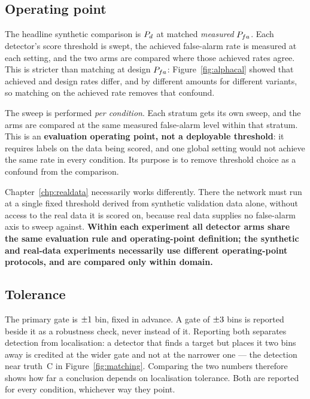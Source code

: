 \subsection{Operating point}
\label{sec:opoint}

The headline synthetic comparison is $P_{d}$ at matched \emph{measured} $P_{fa}$. Each detector's score
threshold is swept, the achieved false-alarm rate is measured at each setting, and the two arms are
compared where those achieved rates agree. This is stricter than matching at design $P_{fa}$:
Figure~\ref{fig:alphacal} showed that achieved and design rates differ, and by different amounts for
different variants, so matching on the achieved rate removes that confound.

The sweep is performed \emph{per condition}. Each stratum gets its own sweep, and the arms are
compared at the same measured false-alarm level within that stratum. This is an \textbf{evaluation
operating point, not a deployable threshold}: it requires labels on the data being scored, and one
global setting would not achieve the same rate in every condition. Its purpose is to remove threshold
choice as a confound from the comparison.

Chapter~\ref{chp:realdata} necessarily works differently. There the network must run at a single
fixed threshold derived from synthetic validation data alone, without access to the real data it is
scored on, because real data supplies no false-alarm axis to sweep against. \textbf{Within each
experiment all detector arms share the same evaluation rule and operating-point definition; the
synthetic and real-data experiments necessarily use different operating-point protocols, and are
compared only within domain.}

\subsection{Tolerance}

The primary gate is $\pm1$ bin, fixed in advance. A gate of $\pm3$ bins
is reported beside it as a robustness check, never instead of it. Reporting both separates detection
from localisation: a detector that finds a target but places it two bins away is credited at the wider
gate and not at the narrower one --- the detection near truth~C in Figure~\ref{fig:matching}.
Comparing the two numbers therefore shows how far a conclusion depends on localisation tolerance.
Both are reported for every condition, whichever way they point.

